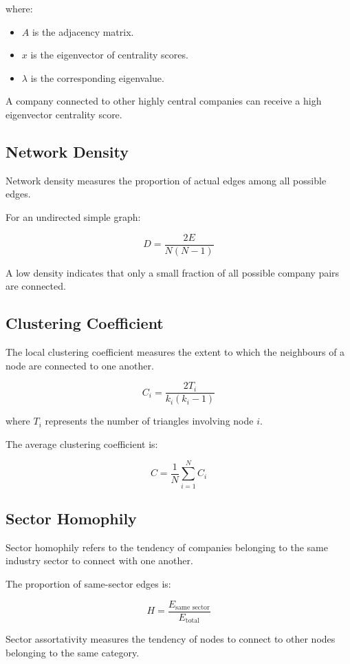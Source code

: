 \documentclass[11pt,a4paper]{article}
\begin{document}
where:

\begin{itemize}
    \item $A$ is the adjacency matrix.
    \item $x$ is the eigenvector of centrality scores.
    \item $\lambda$ is the corresponding eigenvalue.
\end{itemize}

A company connected to other highly central companies
can receive a high eigenvector centrality score.

\subsection{Network Density}

Network density measures the proportion of actual edges
among all possible edges.

For an undirected simple graph:

\[
D=\frac{2E}{N(N-1)}
\]

A low density indicates that only a small fraction
of all possible company pairs are connected.

\subsection{Clustering Coefficient}

The local clustering coefficient measures the extent
to which the neighbours of a node are connected to
one another.

\[
C_i=\frac{2T_i}{k_i(k_i-1)}
\]

where $T_i$ represents the number of triangles involving
node $i$.

The average clustering coefficient is:

\[
C=\frac{1}{N}\sum_{i=1}^{N}C_i
\]

\subsection{Sector Homophily}

Sector homophily refers to the tendency of companies
belonging to the same industry sector to connect with
one another.

The proportion of same-sector edges is:

\[
H=\frac{E_{\text{same sector}}}{E_{\text{total}}}
\]

Sector assortativity measures the tendency of nodes
to connect to other nodes belonging to the same category.
\end{document}
